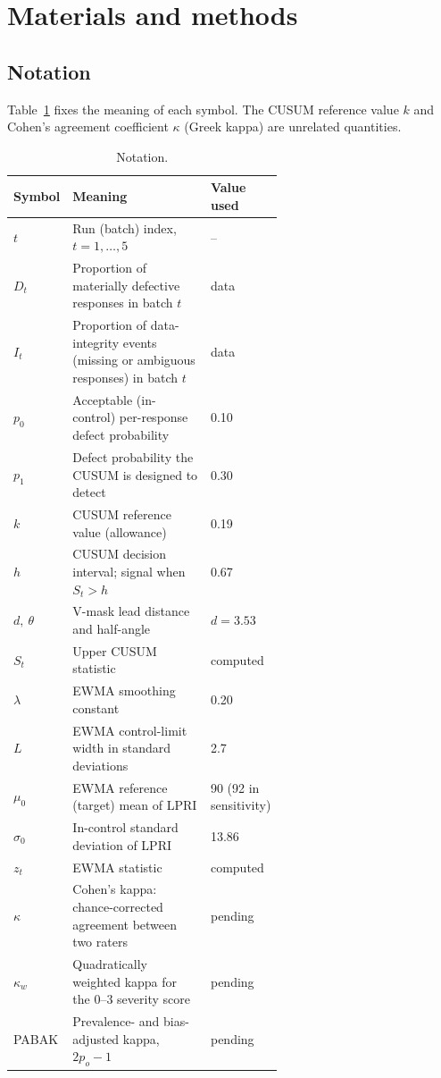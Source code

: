 \documentclass[11pt]{article}
\begin{document}
\section{Materials and methods}\label{sec:methods}

\subsection{Notation}
Table~\ref{tab:notation} fixes the meaning of each symbol. The CUSUM reference value $k$ and Cohen's agreement coefficient $\kappa$ (Greek kappa) are unrelated quantities.

\begin{table}[!htbp]
\centering\small
\caption{Notation.}\label{tab:notation}
\begin{tabular}{@{}l p{0.6\linewidth} l@{}}
\toprule
Symbol & Meaning & Value used \\
\midrule
$t$ & Run (batch) index, $t=1,\dots,5$ & -- \\
$D_t$ & Proportion of materially defective responses in batch $t$ & data \\
$I_t$ & Proportion of data-integrity events (missing or ambiguous responses) in batch $t$ & data \\
$p_0$ & Acceptable (in-control) per-response defect probability & 0.10 \\
$p_1$ & Defect probability the CUSUM is designed to detect & 0.30 \\
$k$ & CUSUM reference value (allowance) & 0.19 \\
$h$ & CUSUM decision interval; signal when $S_t>h$ & 0.67 \\
$d,\ \theta$ & V-mask lead distance and half-angle & $d=3.53$ \\
$S_t$ & Upper CUSUM statistic & computed \\
$\lambda$ & EWMA smoothing constant & 0.20 \\
$L$ & EWMA control-limit width in standard deviations & 2.7 \\
$\mu_0$ & EWMA reference (target) mean of LPRI & 90 (92 in sensitivity) \\
$\sigma_0$ & In-control standard deviation of LPRI & 13.86 \\
$z_t$ & EWMA statistic & computed \\
$\kappa$ & Cohen's kappa: chance-corrected agreement between two raters & pending \\
$\kappa_w$ & Quadratically weighted kappa for the 0--3 severity score & pending \\
PABAK & Prevalence- and bias-adjusted kappa, $2p_o-1$ & pending \\
\bottomrule
\end{tabular}
\end{table}
\end{document}
